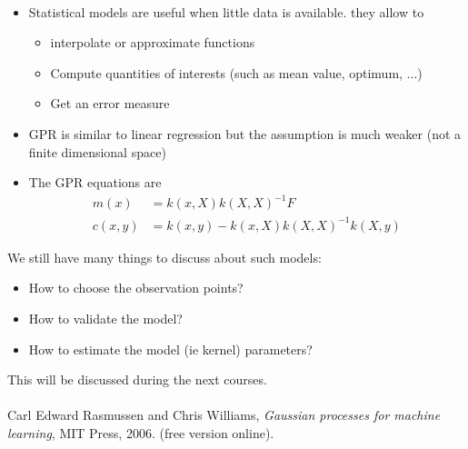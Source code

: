 \documentclass{beamer}
\begin{document}
\begin{frame}{}
\\ \vspace{3mm}
\begin{itemize}
	\item Statistical models are useful when little data is available. they allow to
	\begin{itemize}
		\item interpolate or approximate functions
		\item Compute quantities of interests (such as mean value, optimum, ...)
		\item Get an error measure
	\end{itemize}
	\item GPR is similar to linear regression but the assumption is much weaker (not a finite dimensional space)
	\item The GPR equations are
	\begin{equation*}
		\begin{split}
			m(x) & = k(x,X)k(X,X)^{-1}F\\
			c(x,y) &= k(x,y) - k(x,X)k(X,X)^{-1}k(X,y)
		\end{split}
	\end{equation*}
\end{itemize}
\end{frame}

\begin{frame}{}
We still have many things to discuss about such models:
\begin{itemize}
	\item How to choose the observation points?
	\item How to validate the model?
	\item How to estimate the model (ie kernel) parameters?
\end{itemize}
This will be discussed during the next courses.\\
\vspace{10mm}
\\
Carl Edward Rasmussen and Chris Williams, \emph{Gaussian processes for machine learning}, MIT Press, 2006. (free version online).
\end{frame}


\end{document}
